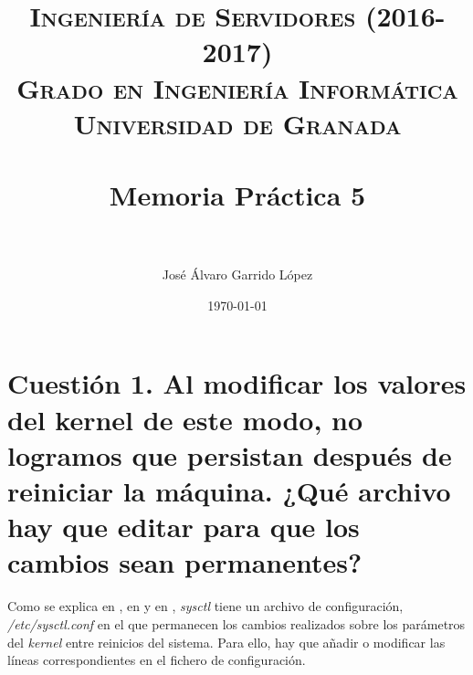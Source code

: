 


\title{	
\normalfont \normalsize 
\textsc{\textbf{Ingeniería de Servidores (2016-2017)} \\ Grado en Ingeniería Informática \\ Universidad de Granada} \\ [25pt] %
\horrule{0.5pt} \\[0.4cm] %
\huge Memoria Práctica 5 \\ %
\horrule{2pt} \\[0.5cm] %
}

\author{José Álvaro Garrido López} %

\date{\normalsize\today} %



\maketitle %

\newpage %

\tableofcontents %

\listoffigures

\newpage

\newpage

\section{Cuestión 1. Al modificar los valores del kernel de este modo, no logramos que persistan después de reiniciar la máquina. ¿Qué archivo hay que editar para que los cambios sean permanentes?}

Como se explica en \cite{sysctl}, en \cite{sysctl-arch} y en \cite{sysctl-conf}, \textit{sysctl} tiene un archivo de configuración, \textit{/etc/sysctl.conf} en el que permanecen los cambios realizados sobre los parámetros del \textit{kernel} entre reinicios del sistema.
Para ello, hay que añadir o modificar las líneas correspondientes en el fichero de configuración.

